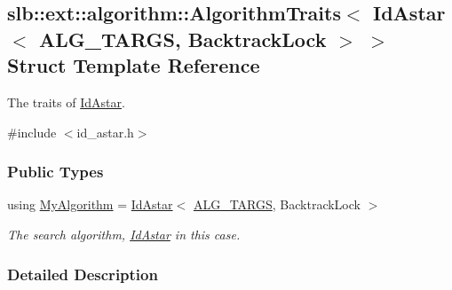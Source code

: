\hypertarget{structslb_1_1ext_1_1algorithm_1_1AlgorithmTraits_3_01IdAstar_3_01ALG__TARGS_00_01BacktrackLock_01_4_01_4}{}\subsection{slb\+:\+:ext\+:\+:algorithm\+:\+:Algorithm\+Traits$<$ Id\+Astar$<$ A\+L\+G\+\_\+\+T\+A\+R\+GS, Backtrack\+Lock $>$ $>$ Struct Template Reference}
\label{structslb_1_1ext_1_1algorithm_1_1AlgorithmTraits_3_01IdAstar_3_01ALG__TARGS_00_01BacktrackLock_01_4_01_4}


The traits of \hyperlink{structslb_1_1ext_1_1algorithm_1_1IdAstar}{Id\+Astar}.  




{\ttfamily \#include $<$id\+\_\+astar.\+h$>$}

\subsubsection*{Public Types}
\begin{DoxyCompactItemize}
\item 
using \hyperlink{structslb_1_1ext_1_1algorithm_1_1AlgorithmTraits_3_01IdAstar_3_01ALG__TARGS_00_01BacktrackLock_01_4_01_4_a21d68144ff3d339ea8acb16b672bc65a}{My\+Algorithm} = \hyperlink{structslb_1_1ext_1_1algorithm_1_1IdAstar}{Id\+Astar}$<$ \hyperlink{algorithm_8h_a425b5a86fe8dae889a8343e14267c3c0}{A\+L\+G\+\_\+\+T\+A\+R\+GS}, Backtrack\+Lock $>$\hypertarget{structslb_1_1ext_1_1algorithm_1_1AlgorithmTraits_3_01IdAstar_3_01ALG__TARGS_00_01BacktrackLock_01_4_01_4_a21d68144ff3d339ea8acb16b672bc65a}{}\label{structslb_1_1ext_1_1algorithm_1_1AlgorithmTraits_3_01IdAstar_3_01ALG__TARGS_00_01BacktrackLock_01_4_01_4_a21d68144ff3d339ea8acb16b672bc65a}

\begin{DoxyCompactList}\small\item\em The search algorithm, \hyperlink{structslb_1_1ext_1_1algorithm_1_1IdAstar}{Id\+Astar} in this case. \end{DoxyCompactList}\end{DoxyCompactItemize}


\subsubsection{Detailed Description}
